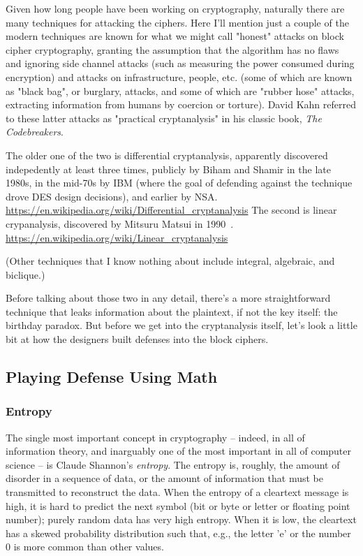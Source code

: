 \documentclass[%
 aip,
 jmp,%
 amsmath,amssymb,
 reprint,%
]{revtex4-1}
\begin{document}
Given how long people have been working on cryptography, naturally
there are many techniques for attacking the ciphers.  Here I'll
mention just a couple of the modern techniques are known for what we
might call "honest" attacks on block cipher cryptography, granting the
assumption that the algorithm has no flaws and ignoring side channel
attacks (such as measuring the power consumed during encryption) and
attacks on infrastructure, people, etc. (some of which are known as
"black bag", or burglary, attacks, and some of which are "rubber hose"
attacks, extracting information from humans by coercion or torture).
David Kahn referred to these latter attacks as "practical
cryptanalysis" in his classic book, \emph{The Codebreakers}.

The older one of the two is differential cryptanalysis, apparently
discovered indepedently at least three times, publicly by Biham and
Shamir in the late 1980s, in the mid-70s by IBM (where the goal of
defending against the technique drove DES design decisions), and
earlier by NSA.
\url{https://en.wikipedia.org/wiki/Differential_cryptanalysis}
The second is linear crypanalysis, discovered by Mitsuru Matsui in
1990~\cite{matsui1993linear}.
\url{https://en.wikipedia.org/wiki/Linear_cryptanalysis}

(Other techniques that I know nothing about include integral,
algebraic, and biclique.)

Before talking about those two in any detail, there's a more
straightforward technique that leaks information about the plaintext,
if not the key itself: the birthday paradox.  But before we get into
the cryptanalysis itself, let's look a little bit at how the designers
built defenses into the block ciphers.

\subsection{Playing Defense Using Math}

\subsubsection{Entropy}

The single most important concept in cryptography -- indeed, in all of
information theory, and inarguably one of the most important in all of
computer science -- is Claude Shannon's \emph{entropy}.  The entropy is,
roughly, the amount of disorder in a sequence of data, or the amount
of information that must be transmitted to reconstruct the data.  When
the entropy of a cleartext message is high, it is hard to predict the
next symbol (bit or byte or letter or floating point number); purely
random data has very high entropy.  When it is low, the cleartext has
a skewed probability distribution such that, e.g., the letter 'e' or
the number 0 is more common than other values.
\end{document}
